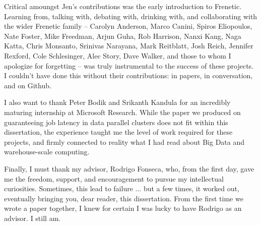 Critical amoungst Jen's contributions was the early introduction to Frenetic.
Learning from, talking with, debating with, drinking with, and collaborating
with the wider Frenetic family --
Carolyn Anderson, Marco Canini, Spiros Eliopoulos, Nate Foster, Mike Freedman,
Arjun Guha, Rob Harrison, Nanxi Kang, Naga Katta, Chris Monsanto, Srinivas Narayana,
Mark Reitblatt, Josh Reich, Jennifer Rexford, Cole Schlesinger, Alec Story,
Dave Walker, and those to whom I apologize for forgetting
-- was truly instrumental to the success of these projects.
I couldn't have done this without their contributions: in papers, in conversation,
and on Github.

I also want to thank Peter Bodik and Srikanth Kandula for an incredibly maturing
internship at Microsoft Research. While the paper we produced on guaranteeing job
latency in data parallel clusters does not fit
within this dissertation, the experience taught me the level of work required for
these projects, and firmly connected to reality what I had read about Big Data
and warehouse-scale computing.

Finally, I must thank my advisor, Rodrigo Fonseca, who, from the first day,
gave me the freedom, support, and encouragement to pursue my intellectual
curiosities. Sometimes, this lead to failure ... but a few times, it worked out,
eventually bringing you, dear reader, this dissertation. From the first time
we wrote a paper together, I knew for certain I was lucky to have Rodrigo
as an advisor. I still am.
